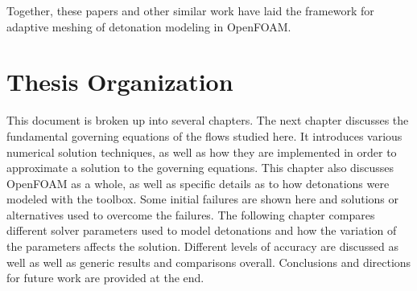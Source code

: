 Together, these papers and other similar work have laid the framework for adaptive meshing of detonation modeling in OpenFOAM. 



\section{Thesis Organization}
This document is broken up into several chapters. The next chapter discusses the fundamental governing equations of the flows studied here. It introduces various numerical solution techniques, as well as how they are implemented in order to approximate a solution to the governing equations. This chapter also discusses OpenFOAM as a whole, as well as specific details as to how detonations were modeled with the toolbox. Some initial failures are shown here and solutions or alternatives used to overcome the failures. The following chapter compares different solver parameters used to model detonations and how the variation of the parameters affects the solution. Different levels of accuracy are discussed as well as well as generic results and comparisons overall. Conclusions and directions for future work are provided at the end.